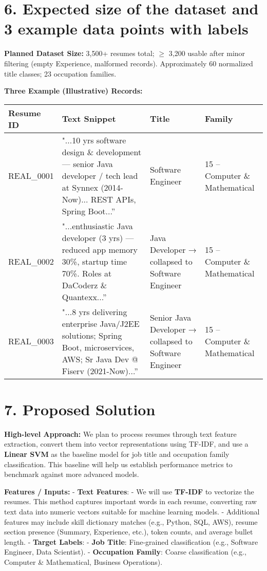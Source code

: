 \documentclass[12pt]{article}
\begin{document}
\section*{6. Expected size of the dataset and 3 example data points with labels}
 
\noindent \textbf{Planned Dataset Size:}  
3,500+ resumes total; $\geq$ 3,200 usable after minor filtering (empty Experience, malformed records). Approximately 60 normalized title classes; 23 occupation families.
 
\medskip
\noindent \textbf{Three Example (Illustrative) Records:}
 
\begin{center}
\begin{tabular}{|p{2.5cm}|p{5.5cm}|p{3.5cm}|p{3.5cm}|}
\hline
\textbf{Resume ID} & \textbf{Text Snippet} & \textbf{Title} & \textbf{Family} \\
\hline
REAL\_0001 & "...10 yrs software design \& development — senior Java developer / tech lead at Synnex (2014-Now)... REST APIs, Spring Boot...'' & Software Engineer & 15 – Computer \& Mathematical \\
REAL\_0002 & "...enthusiastic Java developer (3 yrs) — reduced app memory 30\%, startup time 70\%. Roles at DaCoderz \& Quantexx...'' & Java Developer → collapsed to Software Engineer & 15 – Computer \& Mathematical \\
REAL\_0003 & "...8 yrs delivering enterprise Java/J2EE solutions; Spring Boot, microservices, AWS; Sr Java Dev @ Fiserv (2021-Now)...'' & Senior Java Developer → collapsed to Software Engineer & 15 – Computer \& Mathematical \\
\hline
\end{tabular}
\end{center}
 
 
\section*{7. Proposed Solution}
 
\noindent \textbf{High-level Approach:}  
We plan to process resumes through text feature extraction, convert them into vector representations using TF-IDF, and use a \textbf{Linear SVM} as the baseline model for job title and occupation family classification. This baseline will help us establish performance metrics to benchmark against more advanced models.
 
\medskip
\noindent \textbf{Features / Inputs:}  
- \textbf{Text Features}:  
    - We will use \textbf{TF-IDF} to vectorize the resumes. This method captures important words in each resume, converting raw text data into numeric vectors suitable for machine learning models.
    - Additional features may include skill dictionary matches (e.g., Python, SQL, AWS), resume section presence (Summary, Experience, etc.), token counts, and average bullet length.
- \textbf{Target Labels}:  
    - \textbf{Job Title}: Fine-grained classification (e.g., Software Engineer, Data Scientist).
    - \textbf{Occupation Family}: Coarse classification (e.g., Computer \& Mathematical, Business Operations).
 
\end{document}

